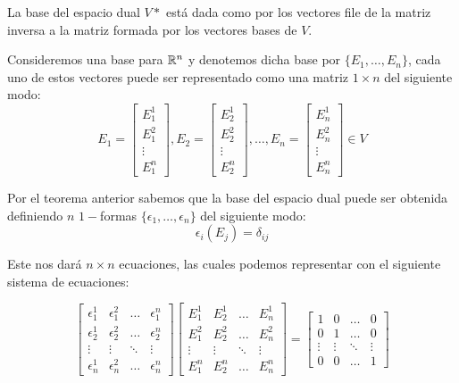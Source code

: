 \begin{example}
  La base del espacio dual $V*$ está dada como por los vectores file de la matriz inversa a la matriz formada por los vectores bases de $V$.

  Consideremos una base para $\mathbb{R}^n$ y denotemos dicha base por $\{E_1,\dots,E_n\}$, cada uno de estos vectores puede ser representado como una matriz $1 \times n$ del siguiente modo:
\[
  E_1 = \begin{bmatrix}
    E_1^1\\[12pt]
    E_1^2\\[12pt]
    \vdots\\[12pt]
    E_1^n
  \end{bmatrix}, E_2 = \begin{bmatrix}
    E_2^1\\[12pt]
    E_2^2 \\[12pt]
    \vdots\\[12pt]
    E_2^n
  \end{bmatrix}, \hdots, E_n = \begin{bmatrix}
    E_n^1\\[12pt]
    E_n^2 \\[12pt]
    \vdots\\[12pt]
    E_n^n
  \end{bmatrix} \in V
\]

  Por el teorema anterior sabemos que la base del espacio dual puede ser obtenida definiendo $n$ $1-$formas $\{\epsilon_1,\dots,\epsilon_n\}$ del siguiente modo:
  \[
    \epsilon_i (E_j) = \delta_{ij}
  \]

  Este nos dará $n \times n$ ecuaciones, las cuales podemos representar con el siguiente sistema de ecuaciones:

\[
  \begin{bmatrix}
    \epsilon_{1}^{1}&\epsilon_{1}^{2}&\hdots&\epsilon_{1}^{n}\\[12pt]
    \epsilon_{2}^{1}&\epsilon_{2}^{2}&\hdots&\epsilon_{2}^{n}\\[12pt]
    \vdots & \vdots & \ddots & \vdots \\[12pt]
    \epsilon_{n}^{1}&\epsilon_{n}^{2}&\hdots&\epsilon_{n}^{n}
  \end{bmatrix}
  \begin{bmatrix}
    E_{1}^{1} & E_{2}^{1} & \hdots & E_{n}^{1}\\[12pt]
    E_{1}^{2} & E_{2}^{2} & \hdots & E_{n}^{2}\\[12pt]
    \vdots & \vdots & \ddots & \vdots \\[12pt]
    E_{1}^{n} & E_{2}^{n} & \hdots & E_{n}^{n}
  \end{bmatrix} = \begin{bmatrix}
    1 & 0 & \hdots & 0\\
    0 & 1 & \hdots & 0\\
    \vdots & \vdots & \ddots & \vdots \\
    0 & 0 & \hdots & 1
  \end{bmatrix}
\]


\end{example}
